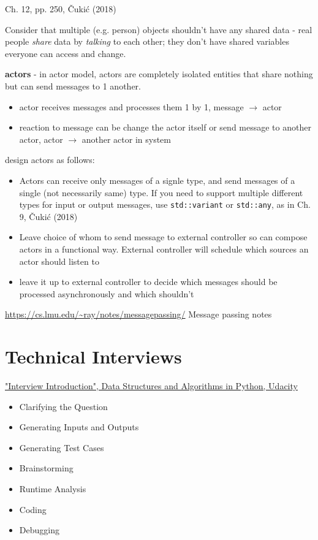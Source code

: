 \documentclass[10pt]{amsart}
\begin{document}
Ch. 12, pp. 250, \v{C}uki\'{c} (2018) \cite{Cuki2018}

Consider that multiple (e.g. person) objects shouldn't have any shared data - real people \emph{share} data by \emph{talking} to each other; they don't have shared variables everyone can access and change.

\textbf{actors} - in actor model, actors are completely isolated entities that share nothing but can send messages to 1 another.
\begin{itemize}
	\item actor receives messages and processes them 1 by 1, message $\to$ actor
	\item reaction to message can be change the actor itself or send message to another actor, actor $\to $ another actor in system
\end{itemize}

design actors as follows:

\begin{itemize}
	\item Actors can receive only messages of a signle type, and send messages of a single (not necessarily same) type. If you need to support multiple different types for input or output messages, use \verb|std::variant| or \verb|std::any|, as in Ch. 9, \v{C}uki\'{c} (2018) \cite{Cuki2008}
	\item Leave choice of whom to send message to external controller so can compose actors in a functional way. External controller will schedule which sources an actor should listen to
	\item leave it up to external controller to decide which messages should be processed asynchronously and which shouldn't
\end{itemize}

\url{https://cs.lmu.edu/~ray/notes/messagepassing/} Message passing notes
	
\part{Technical Interviews}

\href{https://classroom.udacity.com/courses/ud513/lessons/7707710408/concepts/77114606610923}{"Interview Introduction", Data Structures and Algorithms in Python, Udacity}

\begin{itemize}
	\item Clarifying the Question
	\item Generating Inputs and Outputs
	\item Generating Test Cases
	\item Brainstorming
	\item Runtime Analysis
	\item Coding
	\item Debugging
\end{itemize}
\end{document}
